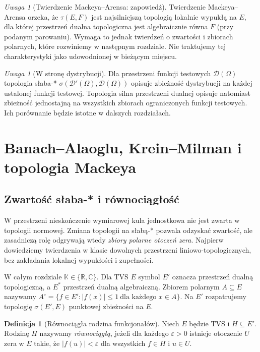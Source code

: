 \documentclass[11pt,a4paper]{article}
\numberwithin{equation}{section}
\theoremstyle{plain}
\theoremstyle{definition}
\newtheorem{definicja}[twierdzenie]{Definicja}
\theoremstyle{remark}
\newtheorem{uwaga}[twierdzenie]{Uwaga}
\newcommand{\R}{\mathbb R}
\newcommand{\C}{\mathbb C}
\newcommand{\K}{\mathbb K}
\begin{document}
\begin{uwaga}[Twierdzenie Mackeya--Arensa: zapowiedź]
Twierdzenie Mackeya--Arensa orzeka, że $\tau(E,F)$ jest
najsilniejszą topologią lokalnie wypukłą na $E$, dla której
przestrzeń dualna topologiczna jest algebraicznie równa $F$
(przy podanym parowaniu). Wymaga to jednak twierdzeń
o zwartości i zbiorach polarnych, które rozwiniemy w następnym
rozdziale. Nie traktujemy tej charakterystyki jako
udowodnionej w bieżącym miejscu.
\end{uwaga}

\begin{uwaga}[W stronę dystrybucji]
Dla przestrzeni funkcji testowych $\mathcal D(\Omega)$
topologia słaba-* $\sigma(\mathcal D'(\Omega),\mathcal D(\Omega))$
opisuje zbieżność dystrybucji na każdej ustalonej funkcji
testowej. Topologia silna przestrzeni dualnej opisuje
natomiast zbieżność jednostajną na wszystkich zbiorach
ograniczonych funkcji testowych. Ich porównanie będzie
istotne w dalszych rozdziałach.
\end{uwaga}


\setcounter{section}{8}
\section{Banach--Alaoglu, Krein--Milman i topologia Mackeya}\label{sec:alaoglu-mackey}

\subsection{Zwartość słaba-* i równociągłość}

W przestrzeni nieskończenie wymiarowej kula jednostkowa nie jest zwarta
w topologii normowej. Zmiana topologii na słabą-* pozwala odzyskać zwartość,
ale zasadniczą rolę odgrywają wtedy \emph{zbiory polarne otoczeń zera}.
Najpierw dowiedziemy twierdzenia w klasie dowolnych przestrzeni
liniowo-topologicznych, bez zakładania lokalnej wypukłości i zupełności.

W całym rozdziale $\K\in\{\R,\C\}$. Dla TVS $E$ symbol $E'$ oznacza
przestrzeń dualną topologiczną, a $E^*$ przestrzeń dualną algebraiczną.
Zbiorem polarnym $A\subseteq E$ nazywamy
$A^\circ=\{f\in E':|f(x)|\le1\ \text{dla każdego }x\in A\}$.
Na $E'$ rozpatrujemy topologię $\sigma(E',E)$ punktowej zbieżności na $E$.

\begin{definicja}[Równociągła rodzina funkcjonałów]\label{def:equicont-family}
Niech $E$ będzie TVS i $H\subseteq E'$. Rodzinę $H$ nazywamy
\emph{równociągłą}, jeżeli dla każdego $\varepsilon>0$ istnieje otoczenie
$U$ zera w $E$ takie, że $|f(u)|<\varepsilon$ dla wszystkich
$f\in H$ i $u\in U$.
\end{definicja}
\end{document}
